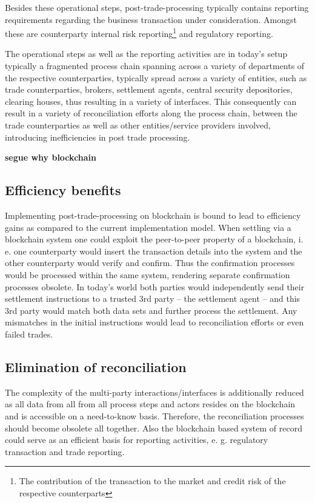 Besides these operational steps, post-trade-processing typically contains reporting requirements regarding the business transaction under consideration. Amongst these are counterparty internal risk reporting\footnote{The contribution of the transaction to the market and credit risk of the respective counterparts} and regulatory reporting. 

The operational steps as well as the reporting activities are in today’s setup typically a fragmented process chain spanning across a variety of departments of the respective counterparties, typically spread across a variety of entities, such as trade counterparties, brokers, settlement agents, central security depositories, clearing houses, thus resulting in a variety of interfaces. This consequently can result in a variety of reconciliation efforts along the process chain, between the trade counterparties as well as other entities/service providers involved, introducing inefficiencies in post trade processing.

\textbf{segue why blockchain}

\subsection{Efficiency benefits}
Implementing post-trade-processing on blockchain is bound to lead to efficiency gains as compared to the current implementation model. When settling via a blockchain system one could exploit the peer-to-peer property of a blockchain, i. e. one counterparty would insert the transaction details into the system and the other counterparty would verify and confirm.  Thus the confirmation processes would be processed within the same system, rendering separate confirmation processes obsolete. In today’s world both parties would independently send their settlement instructions to a trusted 3rd party – the settlement agent – and this 3rd party would match both data sets and further process the settlement. Any mismatches in the initial instructions would lead to reconciliation efforts or even failed trades.

\subsection{Elimination of reconciliation}
The complexity of the multi-party interactions/interfaces is additionally reduced as all data from all from all process steps and actors resides on the blockchain and is accessible on a need-to-know basis. Therefore, the reconciliation processes should become obsolete all together. Also the blockchain based system of record could serve as an efficient basis for reporting activities, e. g. regulatory transaction and trade reporting.

